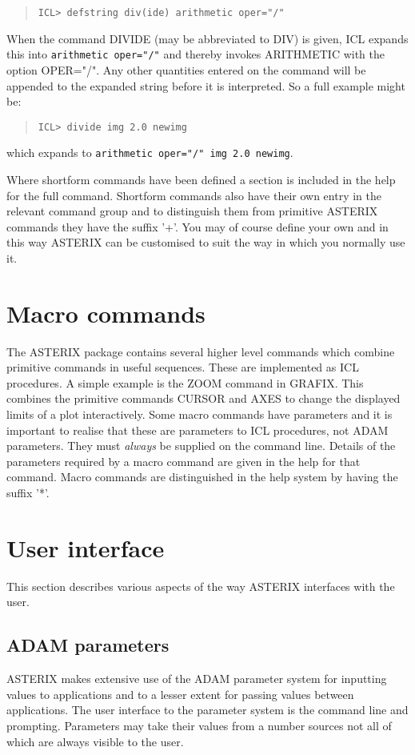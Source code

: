 \documentclass{book}
\renewcommand{\_}{{\tt\char'137}}     %
\begin{document}
\begin{quote}\begin{verbatim}
ICL> defstring div(ide) arithmetic oper="/"
\end{verbatim}\end{quote}
When the command DIVIDE (may be abbreviated to DIV) is given, ICL
expands this into {\tt arithmetic oper="/"} and thereby invokes
ARITHMETIC with the option OPER="/". Any other quantities entered
on the command will be appended to the expanded string before it
is interpreted. So a full example might be:
 
\begin{quote}\begin{verbatim}
ICL> divide img 2.0 newimg
\end{verbatim}\end{quote}
which expands to {\tt arithmetic oper="/" img 2.0 newimg}.
 
Where shortform commands have been defined a section is included
in the help for the full command. Shortform commands also have
their own entry in the relevant command group and to distinguish
them from primitive ASTERIX commands they have the suffix '+'.
You may of course define your own and in this way ASTERIX can be
customised to suit the way in which you normally use it.
 
\chapter{Macro commands}
The ASTERIX package contains several higher level commands which
combine primitive commands in useful sequences. These are
implemented as ICL procedures. A simple example is the ZOOM
command in GRAFIX. This combines the primitive commands CURSOR
and AXES to change the displayed limits of a plot interactively.
Some macro commands have parameters and it is important to realise
that these are parameters to ICL procedures, not ADAM parameters.
They must {\em always} be supplied on the command line. Details of the
parameters required by a macro command are given in the help for
that command. Macro commands are distinguished in the help system
by having the suffix '*'.
 
\chapter{User interface}
This section describes various aspects of the way ASTERIX
interfaces with the user.
 
\section{ADAM parameters}
ASTERIX makes extensive use of the ADAM parameter system for
inputting values to applications and to a lesser extent for
passing values between applications. The user interface to the
parameter system is the command line and prompting. Parameters
may take their values from a number sources not all of which are
always visible to the user.
 
\end{document}
